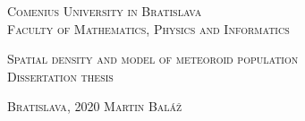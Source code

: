 \begin{titlepage}    
    \begin{center}
        {
            \Large
            \textsc{Comenius University in Bratislava}\\[2mm]
            \textsc{Faculty of Mathematics, Physics and Informatics}\\[12mm]
        }
                
		
        {
            \linespread{1.2}
            \fontsize{30}{30}\selectfont
            \textsc{Spatial density and model of meteoroid population}\\[10mm]
            
            \large
            \textsc{Dissertation thesis}
        }        
        
		
        \vfill
		{						
            \large
			\textsc{Bratislava}, 2020 \hfill \textsc{Martin Baláž}
		}
    \end{center}
\end{titlepage}
